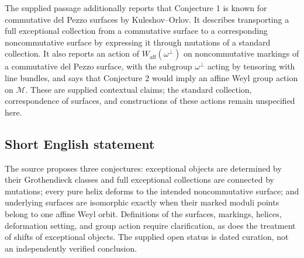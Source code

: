 \documentclass[11pt]{article}
\begin{document}
The supplied passage additionally reports that Conjecture 1 is known for commutative del Pezzo surfaces by Kuleshov--Orlov. It describes transporting a full exceptional collection from a commutative surface to a corresponding noncommutative surface by expressing it through mutations of a standard collection. It also reports an action of \(W_{\mathrm{aff}}(\omega^\perp)\) on noncommutative markings of a commutative del Pezzo surface, with the subgroup \(\omega^\perp\) acting by tensoring with line bundles, and says that Conjecture 2 would imply an affine Weyl group action on \(\mathcal M\). These are supplied contextual claims; the standard collection, correspondence of surfaces, and constructions of these actions remain unspecified here.
\subsection{Short English statement}
The source proposes three conjectures: exceptional objects are determined by their Grothendieck classes and full exceptional collections are connected by mutations; every pure helix deforms to the intended noncommutative surface; and underlying surfaces are isomorphic exactly when their marked moduli points belong to one affine Weyl orbit. Definitions of the surfaces, markings, helices, deformation setting, and group action require clarification, as does the treatment of shifts of exceptional objects. The supplied open status is dated curation, not an independently verified conclusion.
\end{document}
